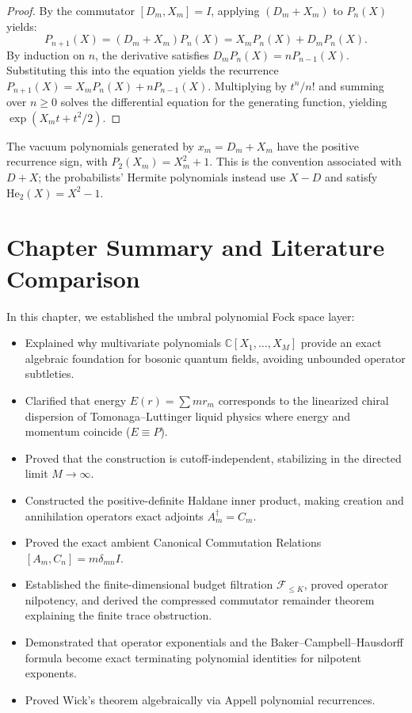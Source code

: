 \begin{proof}
By the commutator $[D_m, X_m] = I$, applying $(D_m + X_m)$ to $P_n(X)$ yields:
\begin{equation}
P_{n+1}(X) = (D_m + X_m) P_n(X) = X_m P_n(X) + D_m P_n(X).
\end{equation}
By induction on $n$, the derivative satisfies $D_m P_n(X) = n P_{n-1}(X)$. Substituting this into the equation yields the recurrence $P_{n+1}(X) = X_m P_n(X) + n P_{n-1}(X)$.
Multiplying by $t^n / n!$ and summing over $n \ge 0$ solves the differential equation for the generating function, yielding $\exp(X_m t + t^2/2)$.
\end{proof}

\begin{remark}
The vacuum polynomials generated by $x_m=D_m+X_m$ have the positive recurrence sign, with $P_2(X_m)=X_m^2+1$. This is the convention associated with $D+X$; the probabilists' Hermite polynomials instead use $X-D$ and satisfy $\mathrm{He}_2(X)=X^2-1$.
\end{remark}

\section{Chapter Summary and Literature Comparison}

In this chapter, we established the umbral polynomial Fock space layer:
\begin{itemize}
    \item Explained why multivariate polynomials $\mathbb{C}[X_1, \dots, X_M]$ provide an exact algebraic foundation for bosonic quantum fields, avoiding unbounded operator subtleties.
    \item Clarified that energy $E(r) = \sum m r_m$ corresponds to the linearized chiral dispersion of Tomonaga--Luttinger liquid physics where energy and momentum coincide ($E \equiv P$).
    \item Proved that the construction is cutoff-independent, stabilizing in the directed limit $M \to \infty$.
    \item Constructed the positive-definite Haldane inner product, making creation and annihilation operators exact adjoints $A_m^\dagger = C_m$.
    \item Proved the exact ambient Canonical Commutation Relations $[A_m, C_n] = m \delta_{mn} I$.
    \item Established the finite-dimensional budget filtration $\mathcal{F}_{\le K}$, proved operator nilpotency, and derived the compressed commutator remainder theorem explaining the finite trace obstruction.
    \item Demonstrated that operator exponentials and the Baker--Campbell--Hausdorff formula become exact terminating polynomial identities for nilpotent exponents.
    \item Proved Wick's theorem algebraically via Appell polynomial recurrences.
\end{itemize}


